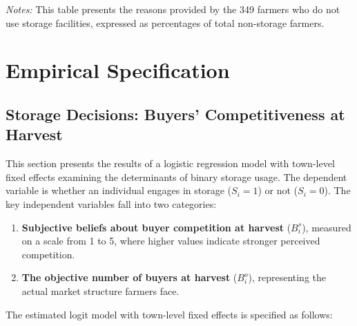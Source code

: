 \begin{table}[H]
    \centering
    \footnotesize
    \caption{Reasons for Not Using Storage Facilities}
    \label{tab:non_storage_reasons}
        \begin{tablenotes}
            \item \textit{Notes:} This table presents the reasons provided by the 349 farmers who do not use storage facilities, expressed as percentages of total non-storage farmers.
        \end{tablenotes}
\end{table}


\section{Empirical Specification}
\subsection{Storage Decisions: Buyers' Competitiveness at Harvest}
\noindent 
This section presents the results of a logistic regression model with town-level fixed effects examining the determinants of binary storage usage. The dependent variable is whether an individual engages in storage ($S_i = 1$) or not ($S_i = 0$). The key independent variables fall into two categories:  
\begin{enumerate}
    \item \textbf{Subjective beliefs about buyer competition at harvest} ($B^s_i$), measured on a scale from 1 to 5, where higher values indicate stronger perceived competition.  
    \item \textbf{The objective number of buyers at harvest} ($B^o_i$), representing the actual market structure farmers face. 
\end{enumerate}
The estimated logit model with town-level fixed effects is specified as follows:

